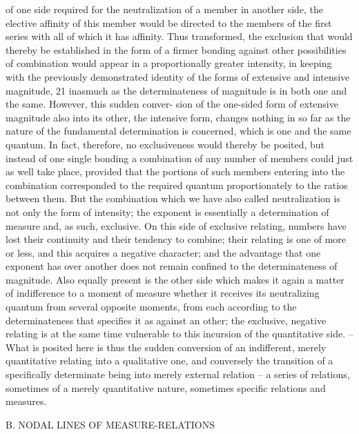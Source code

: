 of one side required for the neutralization of a member in another side, the
elective affinity of this member would be directed to the members of the
first series with all of which it has affinity. Thus transformed, the exclusion
that would thereby be established in the form of a firmer bonding against
other possibilities of combination would appear in a proportionally greater
intensity, in keeping with the previously demonstrated identity of the forms
of extensive and intensive magnitude, 21 inasmuch as the determinateness
of magnitude is in both one and the same. However, this sudden conver-
sion of the one-sided form of extensive magnitude also into its other, the
intensive form, changes nothing in so far as the nature of the fundamental
determination is concerned, which is one and the same quantum. In fact,
therefore, no exclusiveness would thereby be posited, but instead of one
single bonding a combination of any number of members could just as
well take place, provided that the portions of such members entering into
the combination corresponded to the required quantum proportionately
to the ratios between them.
But the combination which we have also called neutralization is not only
the form of intensity; the exponent is essentially a determination of measure
and, as such, exclusive. On this side of exclusive relating, numbers have lost
their continuity and their tendency to combine; their relating is one of more
or less, and this acquires a negative character; and the advantage that one
exponent has over another does not remain confined to the determinateness
of magnitude. Also equally present is the other side which makes it again
a matter of indifference to a moment of measure whether it receives its
neutralizing quantum from several opposite moments, from each according
to the determinateness that specifies it as against an other; the exclusive,
negative relating is at the same time vulnerable to this incursion of the
quantitative side. – What is posited here is thus the sudden conversion
of an indifferent, merely quantitative relating into a qualitative one, and
conversely the transition of a specifically determinate being into merely
external relation – a series of relations, sometimes of a merely quantitative
nature, sometimes specific relations and measures.

B. NODAL LINES OF MEASURE-RELATIONS

